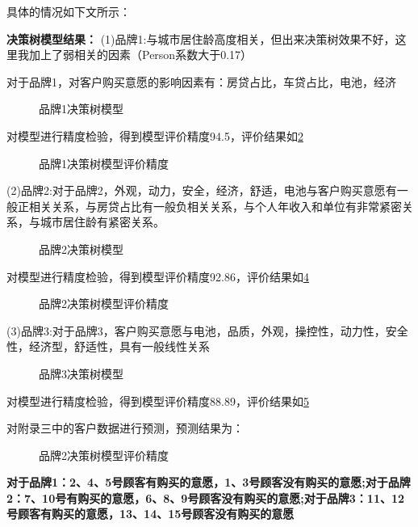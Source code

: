 \documentclass{JXUSTmodeling}
\begin{document}
具体的情况如下文所示：

\textbf{决策树模型结果：}
(1)品牌1:与城市居住龄高度相关，但出来决策树效果不好，这里我加上了弱相关的因素（Person系数大于0.17）

对于品牌1，对客户购买意愿的影响因素有：房贷占比，车贷占比，电池，经济
\begin{figure}[!htbp]
	\centering
	\caption{品牌1决策树模型}
	\label{fig:9}
\end{figure}

对模型进行精度检验，得到模型评价精度94.5，评价结果如\ref{fig:10}

\begin{figure}[!htbp]
	\centering
	\caption{品牌1决策树模型评价精度}
	\label{fig:10}
\end{figure}

(2)品牌2:对于品牌2，外观，动力，安全，经济，舒适，电池与客户购买意愿有一般正相关关系，与房贷占比有一般负相关关系，与个人年收入和单位有非常紧密关系，与城市居住龄有紧密关系。
\begin{figure}[!htbp]
	\centering
	\caption{品牌2决策树模型}
	\label{fig:11}
\end{figure}

对模型进行精度检验，得到模型评价精度92.86，评价结果如\ref{fig:12}

\begin{figure}[!htbp]
	\centering
	\caption{品牌2决策树模型评价精度}
	\label{fig:12}
\end{figure}

(3)品牌3:对于品牌3，客户购买意愿与电池，品质，外观，操控性，动力性，安全性，经济型，舒适性，具有一般线性关系
\begin{figure}[!htbp]
	\centering
	\caption{品牌3决策树模型}
	\label{fig:13}
\end{figure}

对模型进行精度检验，得到模型评价精度88.89，评价结果如\ref{fig:13}

对附录三中的客户数据进行预测，预测结果为：
\begin{figure}[!htbp]
	\centering
	\caption{品牌2决策树模型评价精度}
	\label{fig:14}
\end{figure}

\textbf{对于品牌1：2、4、5号顾客有购买的意愿，1、3号顾客没有购买的意愿;对于品牌2：7、10号有购买的意愿，6、8、9号顾客没有购买的意愿;对于品牌3：11、12号顾客有购买的意愿，13、14、15号顾客没有购买的意愿}
\end{document}
